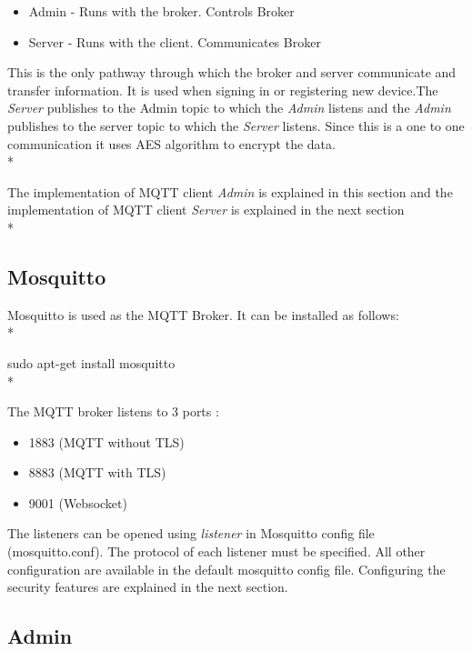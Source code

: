 \documentclass{report}
\begin{document}
\begin{itemize}
    \item Admin - Runs with the broker. Controls Broker
    \item Server - Runs with the client. Communicates Broker
\end{itemize}

This is the only pathway through which the broker and server communicate and transfer information. It is used when signing in or registering new device.The \textit{Server} publishes to the Admin topic to which the \textit{Admin} listens and the \textit{Admin} publishes to the server topic to which the \textit{Server} listens. Since this is a one to one communication it uses AES algorithm to encrypt the data.\\*

The implementation of MQTT client \textit{Admin} is explained in this section and the implementation of MQTT client \textit{Server} is explained in the next section\\*

\subsection{Mosquitto}

Mosquitto is used as the MQTT Broker. It can be installed as follows:\\*

\hspace*{2cm}sudo apt-get install mosquitto\\*

The MQTT broker listens to 3 ports :
\begin{itemize}
    \item 1883 (MQTT without TLS)
    \item 8883 (MQTT with TLS)
    \item 9001 (Websocket)
\end{itemize}

The listeners can be opened using \textit{listener} in Mosquitto config file (mosquitto.conf). The protocol of each listener must be specified. All other configuration are available in the default mosquitto config file. Configuring the security features are explained in the next section.\\

\subsection{Admin}
\end{document}
